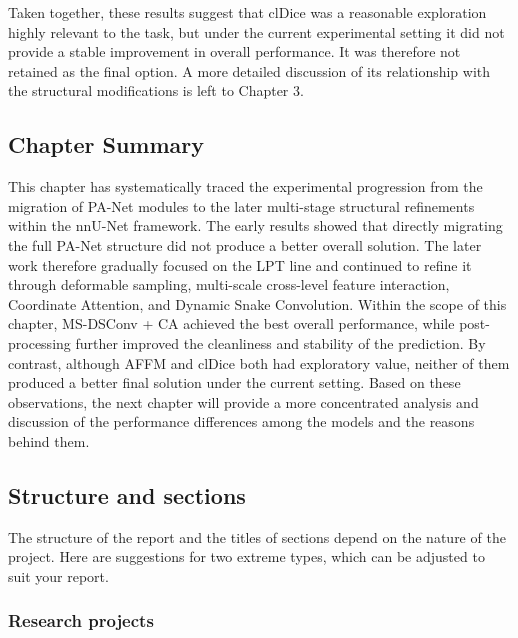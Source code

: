 \documentclass[a4paper,12pt]{article}
\begin{document}
Taken together, these results suggest that clDice was a reasonable exploration highly relevant to the task, but under the current experimental setting it did not provide a stable improvement in overall performance. It was therefore not retained as the final option. A more detailed discussion of its relationship with the structural modifications is left to Chapter 3.

\subsection{Chapter Summary}

This chapter has systematically traced the experimental progression from the migration of PA-Net modules to the later multi-stage structural refinements within the nnU-Net framework. The early results showed that directly migrating the full PA-Net structure did not produce a better overall solution. The later work therefore gradually focused on the LPT line and continued to refine it through deformable sampling, multi-scale cross-level feature interaction, Coordinate Attention, and Dynamic Snake Convolution. Within the scope of this chapter, MS-DSConv + CA achieved the best overall performance, while post-processing further improved the cleanliness and stability of the prediction. By contrast, although AFFM and clDice both had exploratory value, neither of them produced a better final solution under the current setting. Based on these observations, the next chapter will provide a more concentrated analysis and discussion of the performance differences among the models and the reasons behind them.

\subsection{Structure and sections}

The structure of the report and the titles of sections depend on the nature of the project. Here are suggestions for two extreme types, which can be adjusted to suit your report.

\subsubsection{Research projects}
\end{document}
